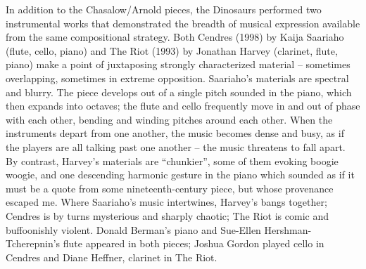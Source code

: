 In addition to the Chasalow/Arnold pieces, the Dinosaurs performed two instrumental works that demonstrated the breadth of musical expression available from the same compositional strategy. Both Cendres (1998) by Kaija Saariaho (flute, cello, piano) and The Riot (1993) by Jonathan Harvey (clarinet, flute, piano) make a point of juxtaposing strongly characterized material – sometimes overlapping, sometimes in extreme opposition. Saariaho’s materials are spectral and blurry. The piece develops out of a single pitch sounded in the piano, which then expands into octaves; the flute and cello frequently move in and out of phase with each other, bending and winding pitches around each other. When the instruments depart from one another, the music becomes dense and busy, as if the players are all talking past one another – the music threatens to fall apart. By contrast, Harvey’s materials are “chunkier”, some of them evoking boogie woogie, and one descending harmonic gesture in the piano which sounded as if it must be a quote from some nineteenth-century piece, but whose provenance escaped me. Where Saariaho’s music intertwines, Harvey’s bangs together; Cendres is by turns mysterious and sharply chaotic; The Riot is comic and buffoonishly violent. Donald Berman’s piano and Sue-Ellen Hershman-Tcherepnin’s flute appeared in both pieces; Joshua Gordon played cello in Cendres and Diane Heffner, clarinet in The Riot.
